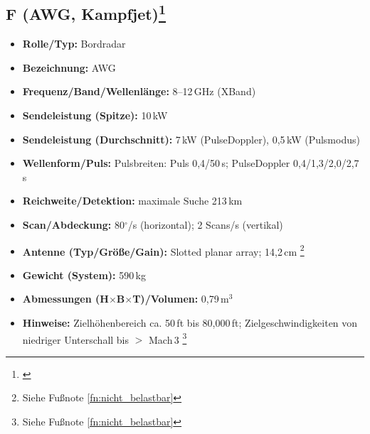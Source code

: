 \subsection*{F (AWG, Kampfjet)\footnote{ \parencite{Forecast1999_AWG9_APG71}}}
\begin{itemize}
  \item \textbf{Rolle/Typ:} Bordradar
  \item \textbf{Bezeichnung:} AWG
  \item \textbf{Frequenz/Band/Wellenlänge:} 8–12\,GHz (X\-Band)
  \item \textbf{Sendeleistung (Spitze):} 10\,kW
  \item \textbf{Sendeleistung (Durchschnitt):} 7\,kW (Pulse\-Doppler), 0{,}5\,kW (Pulsmodus)
  \item \textbf{Wellenform/Puls:} Pulsbreiten: Puls 0{,}4/50\,\textmu s; Pulse\-Doppler 0{,}4/1{,}3/2{,}0/2{,}7\,\textmu s
  \item \textbf{Reichweite/Detektion:} maximale Suche 213\,km
  \item \textbf{Scan/Abdeckung:} 80\(^\circ\)/s (horizontal); 2 Scans/s (vertikal)
  \item \textbf{Antenne (Typ/Größe/Gain):}  Slotted planar array; 14{,}2\,cm \footnote{Siehe Fußnote \ref{fn:nicht_belastbar}}
  \item \textbf{Gewicht (System):} 590\,kg
  \item \textbf{Abmessungen (H\(\times\)B\(\times\)T)/Volumen:} 0{,}79\,m\(^3\)
  \item \textbf{Hinweise:}  Zielhöhenbereich ca. 50\,ft bis 80{,}000\,ft; Zielgeschwindigkeiten von niedriger Unterschall bis \(>\) Mach\,3 \footnote{Siehe Fußnote \ref{fn:nicht_belastbar}}
\end{itemize}


